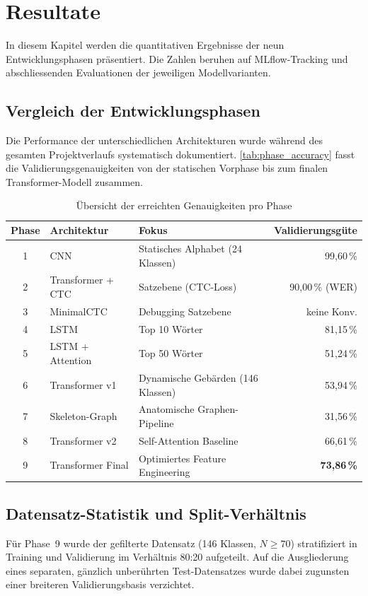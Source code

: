 \chapter{Resultate}
\label{ch:results}

In diesem Kapitel werden die quantitativen Ergebnisse der neun Entwicklungsphasen präsentiert. Die Zahlen beruhen auf MLflow-Tracking und abschliessenden Evaluationen der jeweiligen Modellvarianten.

\section{Vergleich der Entwicklungsphasen}
Die Performance der unterschiedlichen Architekturen wurde während des gesamten Projektverlaufs systematisch dokumentiert. \autoref{tab:phase_accuracy} fasst die Validierungsgenauigkeiten von der statischen Vorphase bis zum finalen Transformer-Modell zusammen.

\begin{table}[H]
\centering
\caption{Übersicht der erreichten Genauigkeiten pro Phase}
\label{tab:phase_accuracy}
\begin{tabular}{cllr}
\toprule
Phase & Architektur & Fokus & Validierungsgüte \\
\midrule
1 & CNN & Statisches Alphabet (24 Klassen) & 99,60\,\% \\
2 & Transformer + CTC & Satzebene (CTC-Loss) & 90,00\,\% (WER) \\
3 & MinimalCTC & Debugging Satzebene & keine Konv. \\
4 & LSTM & Top 10 Wörter & 81,15\,\% \\
5 & LSTM + Attention & Top 50 Wörter & 51,24\,\% \\
6 & Transformer v1 & Dynamische Gebärden (146 Klassen) & 53,94\,\% \\
7 & Skeleton-Graph & Anatomische Graphen-Pipeline & 31,56\,\% \\
8 & Transformer v2 & Self-Attention Baseline & 66,61\,\% \\
9 & Transformer Final & Optimiertes Feature Engineering & \textbf{73,86\,\%}\\
\bottomrule
\end{tabular}
\end{table}

\section{Datensatz-Statistik und Split-Verhältnis}
Für Phase~9 wurde der gefilterte Datensatz (146 Klassen, $N \ge 70$) stratifiziert in Training und Validierung im Verhältnis 80:20 aufgeteilt. Auf die Ausgliederung eines separaten, gänzlich unberührten Test-Datensatzes wurde dabei zugunsten einer breiteren Validierungsbasis verzichtet. 

